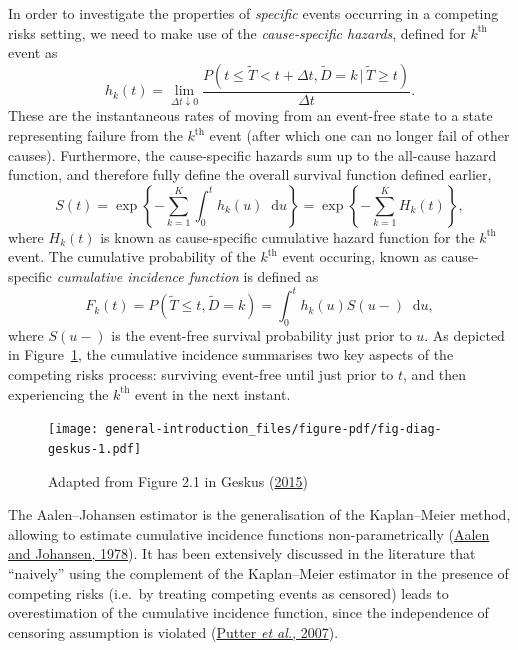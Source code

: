 \documentclass[
  letterpaper,
  DIV=11,
  numbers=noendperiod]{scrreprt}
\newcommand{\given}{\,|\,}
\newcommand\diff{\mathop{}\!\mathrm{d}}
\begin{document}
In order to investigate the properties of \emph{specific} events
occurring in a competing risks setting, we need to make use of the
\emph{cause-specific hazards}, defined for \(k^{\text{th}}\) event as\\
\[
    h_k(t) = \lim_{\Delta t \downarrow 0} \frac{P(t \leq \tilde{T} < t + \Delta t, \tilde{D} = k \given \tilde{T} \geq t)}{\Delta t}.
\] These are the instantaneous rates of moving from an event-free state
to a state representing failure from the \(k^{\text{th}}\) event (after
which one can no longer fail of other causes). Furthermore, the
cause-specific hazards sum up to the all-cause hazard function, and
therefore fully define the overall survival function defined earlier, \[
S(t) = \exp \left\{ - \sum_{k = 1}^{K} \int_{0}^{t} h_k(u)\diff u \right\} = \exp \left\{ - \sum_{k = 1}^{K} H_k(t) \right\},
\] where \(H_k(t)\) is known as cause-specific cumulative hazard
function for the \(k^{\text{th}}\) event. The cumulative probability of
the \(k^{\text{th}}\) event occuring, known as cause-specific
\emph{cumulative incidence function} is defined as \[
    F_k(t) = P(\tilde{T} \leq t, \tilde{D} = k) = \int_{0}^{t}h_k(u)S(u-)\diff u,
\] where \(S(u-)\) is the event-free survival probability just prior to
\(u\). As depicted in Figure~\ref{fig-diag-geskus}, the cumulative
incidence summarises two key aspects of the competing risks process:
surviving event-free until just prior to \(t\), and then experiencing
the \(k^{\text{th}}\) event in the next instant.

\begin{figure}

{\centering \texttt{[image: general-introduction\_files/figure-pdf/fig-diag-geskus-1.pdf]}

}

\caption{\label{fig-diag-geskus}Adapted from Figure 2.1 in Geskus
(\protect\hyperlink{ref-geskus2015data}{2015})}

\end{figure}

The Aalen--Johansen estimator is the generalisation of the Kaplan--Meier
method, allowing to estimate cumulative incidence functions
non-parametrically
(\protect\hyperlink{ref-aalenEmpiricalTransitionMatrix1978}{Aalen and
Johansen, 1978}). It has been extensively discussed in the literature
that ``naively'' using the complement of the Kaplan--Meier estimator in
the presence of competing risks (i.e.~by treating competing events as
censored) leads to overestimation of the cumulative incidence function,
since the independence of censoring assumption is violated
(\protect\hyperlink{ref-putterTutorialBiostatisticsCompeting2007}{Putter
\emph{et al.}, 2007}).
\end{document}
